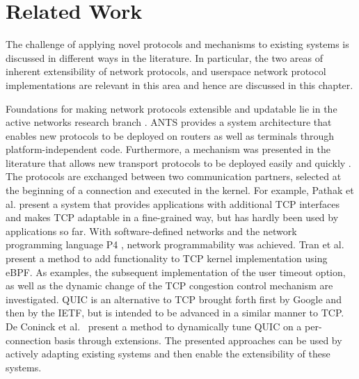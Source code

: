 \section{Related Work}
The challenge of applying novel protocols and mechanisms to existing systems is discussed in different ways in the literature. 
In particular, the two areas of inherent extensibility of network protocols, and userspace network protocol implementations are relevant in this area and hence are discussed in this chapter. 

Foundations for making network protocols extensible and updatable lie in the active networks research branch \cite{A3:tennenhouse1996towards, A3:tennenhouse1997survey}.
ANTS \cite{A3:wetherall1998ants} provides a system architecture that enables new protocols to be deployed on routers as well as terminals through platform-independent code.
Furthermore, a mechanism was presented in the literature that allows new transport protocols to be deployed easily and quickly \cite{A3:patel2003upgrading}. 
The protocols are exchanged between two communication partners, selected at the beginning of a connection and executed in the kernel.
For example, Pathak et al. \cite{A3:pathak2015modnet} present a system that provides applications with additional TCP interfaces and makes TCP adaptable in a fine-grained way, but has hardly been used by applications so far.
With software-defined networks \cite{A3:mckeown2008openflow} and the network programming language P4 \cite{A3:bosshart2014p4}, network programmability was achieved. 
Tran et al.~\cite{A3:tran2019beyond} present a method to add functionality to TCP kernel implementation using eBPF. 
As examples, the subsequent implementation of the user timeout option, as well as the dynamic change of the TCP congestion control mechanism are investigated.
QUIC is an alternative to TCP brought forth first by Google and then by the IETF, but is intended to be advanced in a similar manner to TCP.
De Coninck et al.~\cite{A3:de2019pluginizing,A3:de2018tuning} present a method to dynamically tune QUIC on a per-connection basis through extensions. 
The presented approaches can be used by actively adapting existing systems and then enable the extensibility of these systems.



